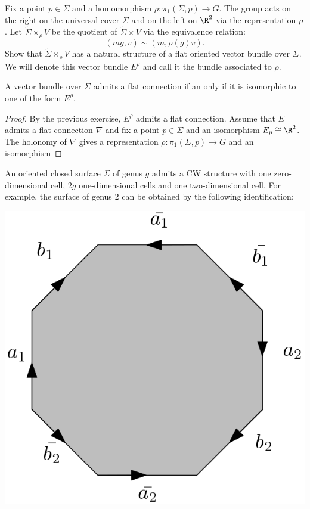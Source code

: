 \begin{exercise}
	Fix a point $p \in \Sigma$ and a homomorphism $\rho: \pi_1(\Sigma, p) \rightarrow G$. The group  acts on the right on the universal cover $\tilde{\Sigma}$ and on the left on $\R^2$ via the representation $\rho$. Let $\tilde{\Sigma}\times_\rho V$ be the quotient of $\tilde{\Sigma} \times V$ via the equivalence relation:
	\[ (m g,v)\sim (m,\rho(g)v).\]
	Show that $\tilde{\Sigma}\times_\rho V$ has a natural structure of a flat oriented vector bundle over $\Sigma$. We will denote this vector bundle $E^\rho$ and call it the bundle associated to $\rho$.
\end{exercise}


\begin{lemma}
	A vector bundle over $\Sigma$ admits a flat connection if an only if it is isomorphic to one of the form $E^\rho$.
\end{lemma}

\begin{proof}
	By the previous exercise, $E^\rho$ admits a flat connection. Assume that $E$ admits a flat connection $\nabla$ and fix a point $p \in \Sigma$ and an isomorphism $E_p\cong \R^2$. The holonomy of $\nabla$ gives a representation $\rho: \pi_1(\Sigma, p) \rightarrow G$ and an isomorphism 
\end{proof}



An oriented closed surface $\Sigma$ of genus $g$ admits a CW structure with one zero-dimensional cell, $2g$  one-dimensional cells and one two-dimensional cell. For example, the surface of genus $2$ can be obtained by the following identification:
\begin{center}
\includegraphics[scale=0.2]{imatesis.png}
\end{center}

